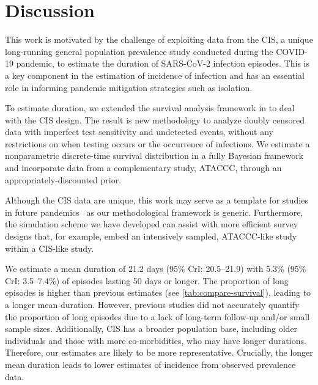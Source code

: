 \documentclass[referee,useAMS,usenatbib]{biom}
\begin{document}
\section{Discussion} \label{sec:discussion}

This work is motivated by the challenge of exploiting data from the CIS, a unique long-running general population prevalence study conducted during the COVID-19 pandemic, to estimate the duration of SARS-CoV-2 infection episodes.
This is a key component in the estimation of incidence of infection and has an essential role in informing pandemic mitigation strategies such as isolation.

To estimate duration, we extended the survival analysis framework in \citet{heiseyModelling} to deal with the CIS design.
The result is new methodology to analyze doubly censored data with imperfect test sensitivity and undetected events, without any restrictions on when testing occurs or the occurrence of infections.
We estimate a nonparametric discrete-time survival distribution in a fully Bayesian framework and incorporate data from a complementary study, ATACCC, through an appropriately-discounted prior.

Although the CIS data are unique, this work may serve as a template for studies in future pandemics~\citep{hallettModule} as
our methodological framework is generic.
Furthermore, the simulation scheme we have developed can assist with  more efficient survey designs that, for example, embed an intensively sampled, ATACCC-like study within a CIS-like study.

We estimate a mean duration of 21.2 days (95\% CrI: 20.5--21.9) with 5.3\% (95\% CrI: 3.5--7.4\%) of episodes lasting 50 days or longer.
The proportion of long episodes is higher than previous estimates (see \cref{tab:compare-survival}), leading to a longer mean duration.
However, previous studies did not accurately quantify the proportion of long episodes due to a lack of long-term follow-up and/or small sample sizes.
Additionally, CIS has a broader population base, including older individuals and those with more co-morbidities, who may have longer durations.
Therefore, our estimates are likely to be more representative.
Crucially, the longer mean duration leads to lower estimates of incidence from observed prevalence data.
\end{document}
